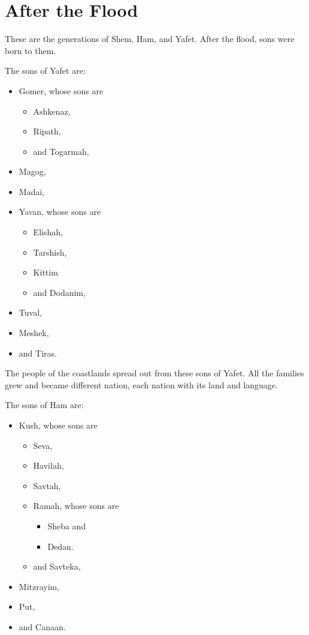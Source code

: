 \chapter{After the Flood}

These are the generations of Shem, Ham, and Yafet.
After the flood, sons were born to them.

The sons of Yafet are:
\begin{itemize}[noitemsep]
\item Gomer, whose sons are
\begin{itemize}[noitemsep]
    \item Ashkenaz,
    \item Ripath,
    \item and Togarmah,
    \end{itemize}
\item Magog,
\item Madai,
\item Yavan, whose sons are
\begin{itemize}[noitemsep] 
    \item Elishah,
    \item Tarshish,
    \item Kittim
    \item and Dodanim,
    \end{itemize}
\item Tuval,
\item Meshek, 
\item and Tiras.
\end{itemize}

The people of the coastlands spread out from these sons of Yafet.
All the families grew and became different nation,
each nation with its land and language.


The sons of Ham are:
\begin{itemize}[noitemsep]
\item Kush, whose sons are
\begin{itemize}[noitemsep]
    \item Seva,
    \item Havilah,
    \item Savtah,
    \item Ramah, whose sons are
\begin{itemize}[noitemsep]
        \item Sheba and 
        \item Dedan. 
        \end{itemize}
    \item and Savteka,
    \end{itemize}
\item Mitzrayim,
\item Put,
\item and Canaan.
\end{itemize}
